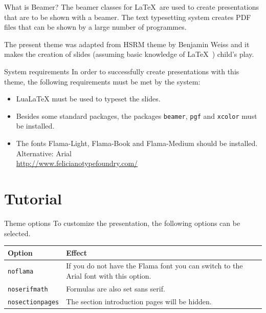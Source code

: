 \documentclass[xcolor={svgnames},12pt,aspectratio=169,handout]{beamer}
\begin{document}
\begin{frame}{What is Beamer?}
    The beamer classes for \LaTeX\ are used to create presentations that are to be shown with a beamer. The text typesetting system creates PDF files that can be shown by a large number of programmes.

    The present theme was adapted from HSRM theme by Benjamin Weiss and it makes the creation of slides (assuming basic knowledge of \LaTeX\ ) child's play.
\end{frame}

\begin{frame}{System requirements}
    In order to successfully create presentations with this theme, the following requirements must be met by the system:

    \begin{itemize}
        \item<1-> LuaLaTeX must be used to typeset the slides.
        \item<2-> Besides some standard packages, the packages \texttt{beamer}, \texttt{pgf} and \texttt{xcolor} must be installed.
        \item<3-> The fonts Flama-Light, Flama-Book and Flama-Medium should be installed. Alternative: Arial\\\url{http://www.felicianotypefoundry.com/}
    \end{itemize}
\end{frame}

\section{Tutorial}

\begin{frame}[shrink]{Theme options}
    To customize the presentation, the following options can be selected.

    \begin{table}[]
        \begin{tabularx}{\linewidth}{l>{\raggedright}X}
            \toprule
            \textbf{Option} & \textbf{Effect} \tabularnewline
            \midrule
            \texttt{noflama} & If you do not have the Flama font you can switch to the Arial font with this option. \tabularnewline
            \texttt{noserifmath} & Formulas are also set sans serif. \tabularnewline
            \texttt{nosectionpages} & The section introduction pages will be hidden.\tabularnewline
            \bottomrule
        \end{tabularx}
        \label{tab:options}
    \end{table}
\end{frame}
\end{document}

